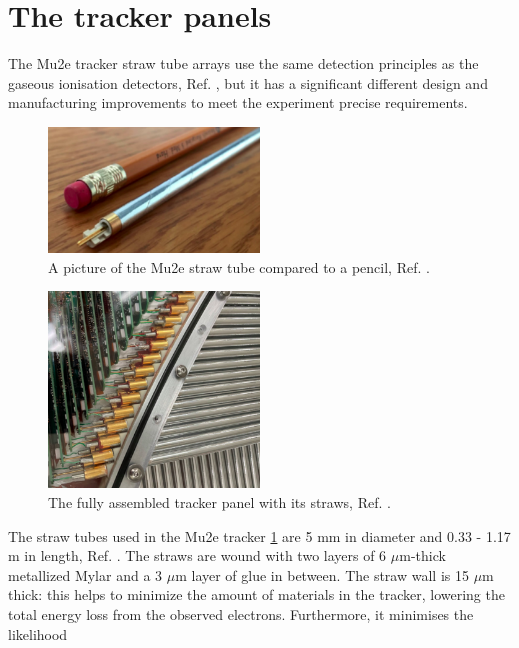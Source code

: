\section{The tracker panels}
The Mu2e tracker straw tube arrays use the same detection principles as the gaseous ionisation detectors, Ref. \cite{kola}, 
but it has a significant different design and manufacturing improvements to meet the experiment precise requirements.
\begin{figure}[!h]
    \centering
    \includegraphics[width =0.5\textwidth]{figures/png/Screenshot_20240327_000000.png}
    \caption{A picture of the Mu2e straw tube
    compared to a pencil, Ref. \cite{trk}.}
    \label{fig:trkpencil}
    \end{figure}
    \begin{figure}[!h]
        \centering
        \includegraphics[width =0.5\textwidth]{figures/png/Screenshot_20240327_000131.png}
        \caption{The fully assembled tracker panel with its straws, Ref. \cite{trk}.}
        \label{fig:strawtubes}
        \end{figure}
The straw tubes used in the Mu2e tracker \ref{fig:trkpencil} are 5 mm in diameter and 0.33 - 1.17 m in length, 
Ref. \cite{bartoszek2015mu2e}. The straws are wound with two layers of 6 $\mu$m-thick metallized Mylar and a 3 
$\mu$m layer of glue in between. The straw wall is 15 $\mu$m thick: this helps to minimize the amount of materials 
in the tracker, lowering the total energy loss from the observed electrons. Furthermore, it minimises the likelihood 
